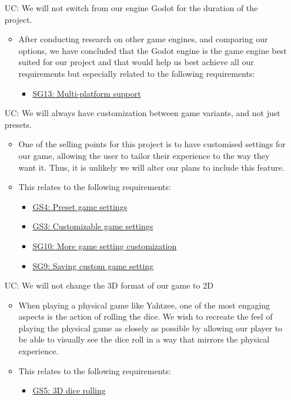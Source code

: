 \begin{itemize}
\item[UC\refstepcounter{ucnum}\theucnum \label{ULC_godot}:] We will not switch from our engine Godot for the duration of the project.

\begin{itemize}
	\item After conducting research on other game engines, and comparing our options, we have concluded that the Godot engine is the game engine best suited for our project and that would help us best achieve all our requirements but especially related to the following requirements: 
	\begin{itemize}
		\item \hyperref[G_platforms]{SG13: Multi-platform support}
	\end{itemize}
\end{itemize}

\item[UC\refstepcounter{ucnum}\theucnum \label{ULC_customization}:] We will always have customization between game variants, and not just presets.


\begin{itemize}
	\item One of the selling points for this project is to have customised settings for our game, allowing the user to tailor their experience to the way they want it. Thus, it is unlikely we will alter our plans to include this feature.
	\item This relates to the following requirements: 
	\begin{itemize}
		\item \hyperref[G_presets]{GS4: Preset game settings}
		\item \hyperref[G_customization]{GS3: Customizable game settings}
		\item \hyperref[G_customization2]{SG10: More game setting customization}
		\item \hyperref[G_saving]{SG9: Saving custom game setting}
	\end{itemize}
\end{itemize}

\item[UC\refstepcounter{ucnum}\theucnum \label{ULC_3D}:] We will not change the 3D format of our game to 2D

\begin{itemize}
	\item When playing a physical game like Yahtzee, one of the most engaging aspects is the action of rolling the dice. We wish to recreate the feel of playing the physical game as closely as possible by allowing our player to be able to visually see the dice roll in a way that mirrors the physical experience.
	\item This relates to the following requirements: 
	\begin{itemize}
		\item \hyperref[G_3D]{GS5: 3D dice rolling}
	\end{itemize}
\end{itemize}




	


\end{itemize}
